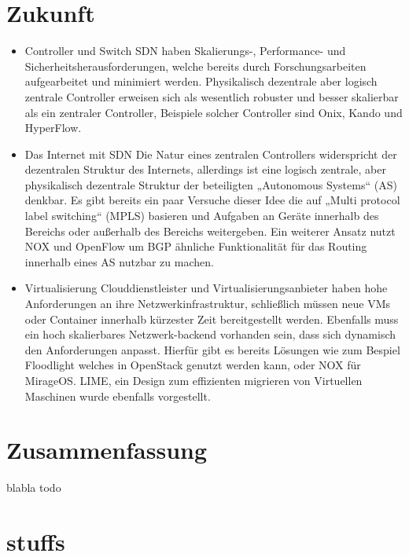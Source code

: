 \documentclass[twoside,12pt]{scrartcl}
\begin{document}
\section{Zukunft}
\begin{itemize}
	\item Controller und Switch
	SDN haben Skalierungs-, Performance- und Sicherheitsherausforderungen, welche bereits durch Forschungsarbeiten aufgearbeitet und minimiert werden. Physikalisch dezentrale aber logisch zentrale Controller erweisen sich als wesentlich robuster und besser skalierbar als ein zentraler Controller, Beispiele solcher Controller sind Onix, Kando und HyperFlow.
	\item Das Internet mit SDN
	Die Natur eines zentralen Controllers widerspricht der dezentralen Struktur des Internets, allerdings ist eine logisch zentrale, aber physikalisch dezentrale Struktur der beteiligten „Autonomous Systems“ (AS) denkbar. Es gibt bereits ein paar Versuche dieser Idee die auf „Multi protocol label switching“ (MPLS) basieren und Aufgaben an Geräte innerhalb des Bereichs oder außerhalb des Bereichs weitergeben. Ein weiterer Ansatz nutzt NOX und OpenFlow  um BGP ähnliche Funktionalität für das Routing innerhalb eines AS nutzbar zu machen.
	\item Virtualisierung
	Clouddienstleister und Virtualisierungsanbieter haben hohe Anforderungen an ihre Netzwerkinfrastruktur, schließlich müssen neue VMs oder Container innerhalb kürzester Zeit bereitgestellt werden. Ebenfalls muss ein hoch skalierbares Netzwerk-backend vorhanden sein, dass sich dynamisch den Anforderungen anpasst. Hierfür gibt es bereits Lösungen wie zum Bespiel Floodlight welches in OpenStack genutzt werden kann, oder NOX für MirageOS. LIME, ein Design zum effizienten migrieren von Virtuellen Maschinen wurde ebenfalls vorgestellt.
\end{itemize}

\section{Zusammenfassung}



blabla todo



\section{stuffs}
	
	\listoffigures
	
	
	\listoftables
	
	\printglossary[style=altlist,title=Glossar]
	\newpage
	
	\nocite{*}
				
	 
	
\end{document}
